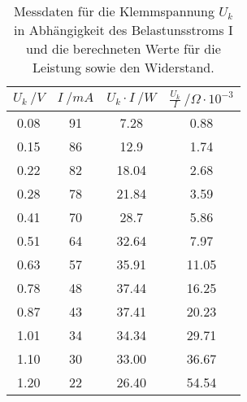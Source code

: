 \begin{table}[H]
  \centering
   \begin{tabular}{c c c c}
    \toprule
    $U_{k} \: /V $ & $ I \: /mA $ & $ U_{k} \cdot I\: /W $ &
    $ \frac{U_{k}}{I}\: /\Omega \cdot 10^{-3} $  \\
    \midrule
    0.08 & 91 & 7.28 & 0.88 \\
    0.15 & 86 & 12.9 & 1.74 \\
    0.22 & 82 & 18.04 & 2.68\\
    0.28 & 78 & 21.84 & 3.59\\
    0.41 & 70 & 28.7 & 5.86\\
    0.51 & 64 & 32.64 & 7.97\\
    0.63 & 57 & 35.91 & 11.05\\
    0.78 & 48 & 37.44 & 16.25\\
    0.87 & 43 & 37.41 & 20.23\\
    1.01 & 34 & 34.34 & 29.71\\
    1.10 & 30 & 33.00 & 36.67\\
    1.20 & 22 & 26.40 & 54.54\\
    \bottomrule
  \end{tabular}
  \caption{Messdaten für die Klemmspannung $U_{k}$ in Abhängigkeit des Belastunsstroms I und
  die berechneten Werte für die Leistung sowie den Widerstand.}
  \label{tab:tabelle5}
\end{table}
